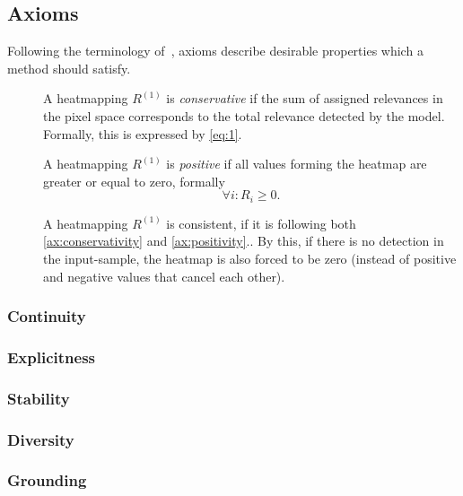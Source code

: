 \subsection{Axioms}
Following the terminology of~\cite{Sundararajan.2017}, axioms describe desirable properties which a method should satisfy.

\begin{description}
    \item[] A heatmapping \(R^{(1)}\) is \textit{conservative} if the sum of assigned relevances in the pixel space corresponds to the total relevance detected by the model.\cite{Montavon.2017} Formally, this is expressed by \cref{eq:1}.
    \item[] A heatmapping \(R^{(1)}\) is \textit{positive} if all values forming the heatmap are greater or equal to zero\cite{Montavon.2017}, formally
    \[
        \forall i: R_i \geq 0.
    \]
    \item[] A heatmapping \(R^{(1)}\) is consistent, if it is following both \ref{ax:conservativity} and \ref{ax:positivity}.\cite{Montavon.2017}. By this, if there is no detection in the input-sample, the heatmap is also forced to be zero (instead of positive and negative values that cancel each other)\cite{Montavon.2017}.
\end{description}


\subsubsection{Continuity}
\subsubsection{Explicitness}
\citeauthor{AlvarezMelis.2018}
\subsubsection{Stability}
\citeauthor{AlvarezMelis.2018}
\subsubsection{Diversity}
\citeauthor{AlvarezMelis.2018}
\subsubsection{Grounding}
\citeauthor{AlvarezMelis.2018}

